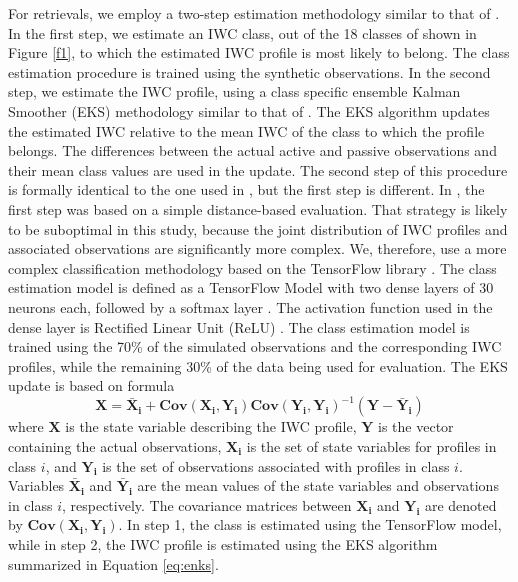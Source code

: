 \documentclass{ametsocV6.1}
\begin{document}
For retrievals, we employ a two-step estimation methodology similar to that of \cite{grecu2018}.  In the first step, we 
estimate an IWC class, out of the 18 classes of shown in Figure \ref{f1}, to which the estimated IWC profile is most likely to belong. The class estimation procedure is trained using the synthetic observations. In the second step, we estimate the IWC profile, using a class specific ensemble Kalman Smoother (EKS) methodology similar to that of \cite{grecu2018}. The EKS algorithm updates the estimated IWC relative to the mean IWC of the class to which the profile belongs. The differences between the actual active and passive observations and their mean class values are used in the update. The second step of this procedure is formally identical to the one used in \cite{grecu2018}, but the first step is different. In \cite{grecu2018}, the first step was based on a simple distance-based evaluation. That strategy is likely to be suboptimal in this study, because the joint distribution of IWC profiles and associated observations are significantly more complex. We, therefore, use a more complex classification methodology based on the TensorFlow library \citep{tensorflow2016}. The class estimation model is defined as a
TensorFlow Model with two dense layers of 30 neurons each, followed by a softmax layer \citep{deepL2016}. The activation function used in the dense layer is Rectified Linear Unit (ReLU) \citep{nair2010}. The class estimation model is trained using the 70\% of the simulated observations and the corresponding IWC profiles, while the remaining 30\% of the data being used for evaluation. The EKS update is based on formula%
\begin{equation}
    \mathbf{X}=\mathbf{\bar{X}_i}+\mathbf{Cov(X_i,Y_i)}\mathbf{Cov(Y_i,Y_i)}^{-1}(\mathbf{Y}-\mathbf{\bar{Y}_i}) \label{eq:enks}
\end{equation}
where $\mathbf{X}$ is the state variable describing the IWC profile, $\mathbf{Y}$ is the vector containing the actual observations, $\mathbf{X_i}$ is the set of state variables for profiles in class $i$, and $\mathbf{Y_i}$ is the set of observations associated with profiles in class $i$.  Variables $\mathbf{\bar{X}_i}$ and $\mathbf{\bar{Y}_i}$ are the mean values of the state variables and observations in class $i$, respectively. The covariance matrices between  $\mathbf{X_i}$ and $\mathbf{Y_i}$ are denoted by $\mathbf{Cov(X_i,Y_i)}$. In step 1, the class is estimated using the TensorFlow model, while in step 2, the IWC profile is estimated using the EKS algorithm summarized in Equation \ref{eq:enks}.
\end{document}
